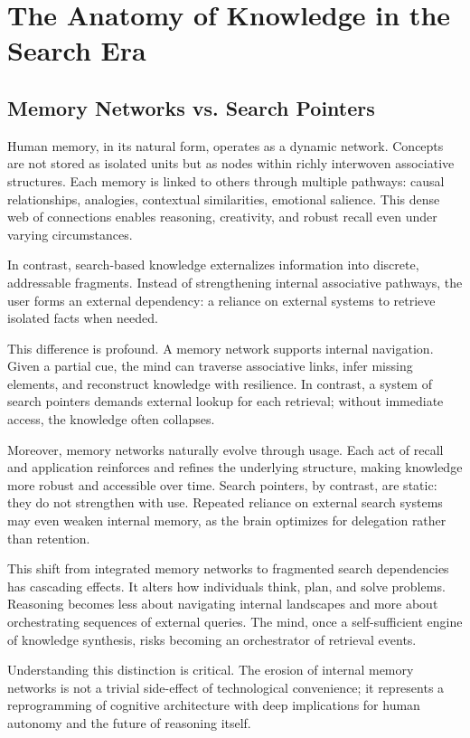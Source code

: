 \chapter{The Anatomy of Knowledge in the Search Era}

\section{Memory Networks vs. Search Pointers}

Human memory, in its natural form, operates as a dynamic network.
Concepts are not stored as isolated units but as nodes within richly
interwoven associative structures. Each memory is linked to others
through multiple pathways: causal relationships, analogies, contextual
similarities, emotional salience. This dense web of connections enables
reasoning, creativity, and robust recall even under varying
circumstances.

In contrast, search-based knowledge externalizes information into
discrete, addressable fragments. Instead of strengthening internal
associative pathways, the user forms an external dependency: a reliance
on external systems to retrieve isolated facts when needed.

This difference is profound. A memory network supports internal
navigation. Given a partial cue, the mind can traverse associative
links, infer missing elements, and reconstruct knowledge with
resilience. In contrast, a system of search pointers demands external
lookup for each retrieval; without immediate access, the knowledge often
collapses.

Moreover, memory networks naturally evolve through usage. Each act of
recall and application reinforces and refines the underlying structure,
making knowledge more robust and accessible over time. Search pointers,
by contrast, are static: they do not strengthen with use. Repeated
reliance on external search systems may even weaken internal memory, as
the brain optimizes for delegation rather than retention.

This shift from integrated memory networks to fragmented search
dependencies has cascading effects. It alters how individuals think,
plan, and solve problems. Reasoning becomes less about navigating
internal landscapes and more about orchestrating sequences of external
queries. The mind, once a self-sufficient engine of knowledge synthesis,
risks becoming an orchestrator of retrieval events.

Understanding this distinction is critical. The erosion of internal
memory networks is not a trivial side-effect of technological
convenience; it represents a reprogramming of cognitive architecture
with deep implications for human autonomy and the future of reasoning
itself.



